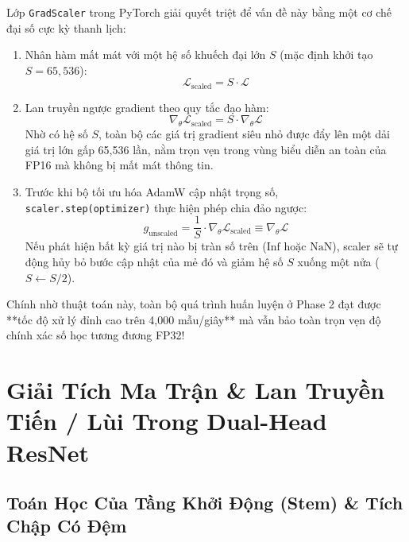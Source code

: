 \documentclass[11pt,a4paper]{report}
\begin{document}
Lớp \texttt{GradScaler} trong PyTorch giải quyết triệt để vấn đề này bằng một cơ chế đại số cực kỳ thanh lịch:
\begin{enumerate}
    \item Nhân hàm mất mát với một hệ số khuếch đại lớn $S$ (mặc định khởi tạo $S = 65{,}536$):
    \begin{equation}
        \mathcal{L}_{\text{scaled}} = S \cdot \mathcal{L}
    \end{equation}
    \item Lan truyền ngược gradient theo quy tắc đạo hàm:
    \begin{equation}
        \nabla_\theta \mathcal{L}_{\text{scaled}} = S \cdot \nabla_\theta \mathcal{L}
    \end{equation}
    Nhờ có hệ số $S$, toàn bộ các giá trị gradient siêu nhỏ được đẩy lên một dải giá trị lớn gấp 65,536 lần, nằm trọn vẹn trong vùng biểu diễn an toàn của FP16 mà không bị mất mát thông tin.
    \item Trước khi bộ tối ưu hóa AdamW cập nhật trọng số, \texttt{scaler.step(optimizer)} thực hiện phép chia đảo ngược:
    \begin{equation}
        g_{\text{unscaled}} = \frac{1}{S} \cdot \nabla_\theta \mathcal{L}_{\text{scaled}} \equiv \nabla_\theta \mathcal{L}
    \end{equation}
    Nếu phát hiện bất kỳ giá trị nào bị tràn số trên ($\text{Inf}$ hoặc $\text{NaN}$), scaler sẽ tự động hủy bỏ bước cập nhật của mẻ đó và giảm hệ số $S$ xuống một nửa ($S \leftarrow S / 2$).
\end{enumerate}

Chính nhờ thuật toán này, toàn bộ quá trình huấn luyện ở Phase 2 đạt được **tốc độ xử lý đỉnh cao trên 4,000 mẫu/giây** mà vẫn bảo toàn trọn vẹn độ chính xác số học tương đương FP32!

\chapter{Giải Tích Ma Trận \& Lan Truyền Tiến / Lùi Trong Dual-Head ResNet}

\section{Toán Học Của Tầng Khởi Động (Stem) \& Tích Chập Có Đệm}
\end{document}
